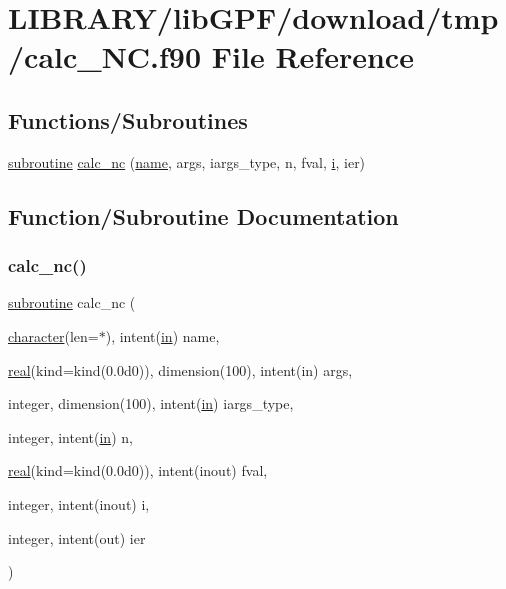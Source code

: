 \hypertarget{calc__NC_8f90}{}\section{L\+I\+B\+R\+A\+R\+Y/lib\+G\+P\+F/download/tmp/calc\+\_\+\+NC.f90 File Reference}
\label{calc__NC_8f90}
\subsection*{Functions/\+Subroutines}
\begin{DoxyCompactItemize}
\item 
\hyperlink{M__stopwatch_83_8txt_acfbcff50169d691ff02d4a123ed70482}{subroutine} \hyperlink{calc__NC_8f90_a099c0657056c90b5f187d2f17a292ffc}{calc\+\_\+nc} (\hyperlink{M__stopwatch_83_8txt_a3f508a893ae4c3b397b4383e33b9bcae}{name}, args, iargs\+\_\+type, n, fval, \hyperlink{intro__blas1_83_8txt_a8ba82a50c0c2c12d5f6a77f7e4651c0b}{i}, ier)
\end{DoxyCompactItemize}


\subsection{Function/\+Subroutine Documentation}
\mbox{\label{calc__NC_8f90_a099c0657056c90b5f187d2f17a292ffc}} 
\subsubsection{\texorpdfstring{calc\+\_\+nc()}{calc\_nc()}}
{\footnotesize\ttfamily \hyperlink{M__stopwatch_83_8txt_acfbcff50169d691ff02d4a123ed70482}{subroutine} calc\+\_\+nc (\begin{DoxyParamCaption}\item[{\hyperlink{option__stopwatch_83_8txt_abd4b21fbbd175834027b5224bfe97e66}{character}(len=$\ast$), intent(\hyperlink{M__journal_83_8txt_afce72651d1eed785a2132bee863b2f38}{in})}]{name,  }\item[{\hyperlink{read__watch_83_8txt_abdb62bde002f38ef75f810d3a905a823}{real}(kind=kind(0.\+0d0)), dimension(100), intent(in)}]{args,  }\item[{integer, dimension(100), intent(\hyperlink{M__journal_83_8txt_afce72651d1eed785a2132bee863b2f38}{in})}]{iargs\+\_\+type,  }\item[{integer, intent(\hyperlink{M__journal_83_8txt_afce72651d1eed785a2132bee863b2f38}{in})}]{n,  }\item[{\hyperlink{read__watch_83_8txt_abdb62bde002f38ef75f810d3a905a823}{real}(kind=kind(0.\+0d0)), intent(inout)}]{fval,  }\item[{integer, intent(inout)}]{i,  }\item[{integer, intent(out)}]{ier }\end{DoxyParamCaption})}



